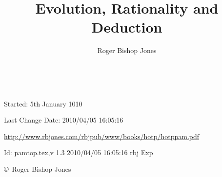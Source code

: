 \documentclass[10pt,a4paper.titlepage,openany,twocolumn]{book}
\author{Roger Bishop Jones}
\title{Evolution, Rationality and Deduction}
\date{\ }
\begin{document}
\frontmatter

\begin{titlepage}
\maketitle

\vfill

\begin{centering}

{\footnotesize

Started: 5th January 1010

Last Change $ $Date: 2010/04/05 16:05:16 $ $

\href{http://www.rbjones.com/rbjpub/www/books/hotp/hotppam.pdf}
{http://www.rbjones.com/rbjpub/www/books/hotp/hotppam.pdf}

$ $Id: pamtop.tex,v 1.3 2010/04/05 16:05:16 rbj Exp $ $

\copyright\ Roger Bishop Jones

}%

\end{centering}

\thispagestyle{empty}
\end{titlepage}

\onecolumn

{\parskip=0pt\tableofcontents}

\vfill

\pagebreak

\twocolumn
\end{document}
